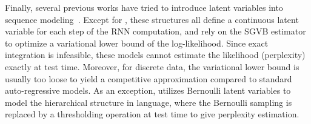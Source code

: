 Finally, several previous works have tried to introduce latent variables into sequence modeling~\citep{bayer2014learning,gregor2015draw,chung2015recurrent,gan2015deep,fraccaro2016sequential,chung2016hierarchical}. Except for \citep{chung2016hierarchical}, these structures all define a continuous latent variable for each step of the RNN computation, and rely on the SGVB estimator~\citep{kingma2013auto} to optimize a variational lower bound of the log-likelihood.
Since exact integration is infeasible, these models cannot estimate the likelihood (perplexity) exactly at test time. Moreover, for discrete data, the variational lower bound is usually too loose to yield a competitive approximation compared to standard auto-regressive models. As an exception, \citet{chung2016hierarchical} utilizes Bernoulli latent variables to model the hierarchical structure in language, where the Bernoulli sampling is replaced by a thresholding operation at test time to give perplexity estimation.

